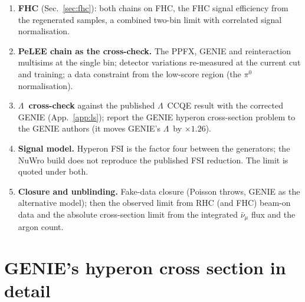 \documentclass[11pt,a4paper]{article}
\newcommand{\Lam}{\ensuremath{\Lambda}}
\newcommand{\numubar}{\ensuremath{\bar{\nu}_\mu}}
\begin{document}
\begin{enumerate}
\begin{itemize}
          background component, on the same footing as the CV.
    \item Systematics: flux, cross section (with the hyperon cross section and FSI), reinteraction,
          and a hypana detector-variation set; the island test's data/MC agreement and the
          sidebands (\Lam\ mass, island fail, PID fail).
    \item The island retune on the QE sample, with the preselection kept as it is.
  \end{itemize}
  \item \textbf{FHC} (Sec.~\ref{sec:fhc}): both chains on FHC, the FHC signal efficiency from the
        regenerated samples, a combined two-bin limit with correlated signal normalisation.
  \item \textbf{PeLEE chain as the cross-check.} The PPFX, GENIE and reinteraction multisims at
        the single bin; detector variations re-measured at the current cut and training; a
        data constraint from the low-score region (the $\pi^0$ normalisation).
  \item \textbf{\Lam\ cross-check} against the published \Lam\ CCQE result with the corrected
        GENIE (App.~\ref{app:ls}); report the GENIE hyperon cross-section problem to the GENIE
        authors (it moves GENIE's \Lam\ by $\times1.26$).
  \item \textbf{Signal model.} Hyperon FSI is the factor four between the generators; the NuWro
        build does not reproduce the published FSI reduction. The limit is quoted under both.
  \item \textbf{Closure and unblinding.} Fake-data closure (Poisson throws, GENIE as the
        alternative model); then the observed limit from RHC (and FHC) beam-on data and the
        absolute cross-section limit from the integrated $\numubar$ flux and the argon count.
\end{enumerate}

\appendix

\section{GENIE's hyperon cross section in detail}
\label{app:pais}
\end{document}
